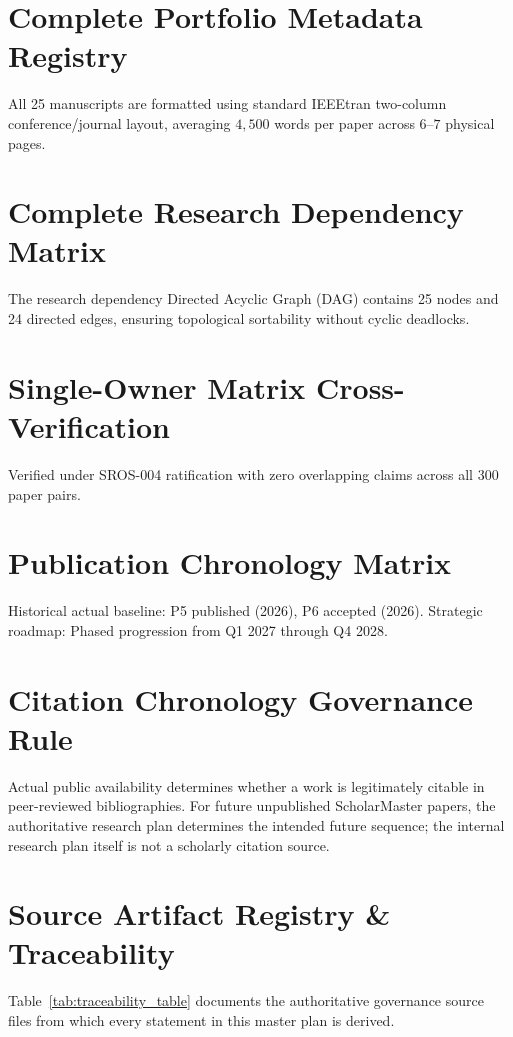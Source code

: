 \documentclass[11pt,letterpaper]{article}
\begin{document}
\appendix

\section{Complete Portfolio Metadata Registry}
\label{app:metadata}
All 25 manuscripts are formatted using standard IEEEtran two-column conference/journal layout, averaging $4,500$ words per paper across $6$--$7$ physical pages.

\section{Complete Research Dependency Matrix}
\label{app:dependencies}
The research dependency Directed Acyclic Graph (DAG) contains 25 nodes and 24 directed edges, ensuring topological sortability without cyclic deadlocks.

\section{Single-Owner Matrix Cross-Verification}
\label{app:single_owner}
Verified under SROS-004 ratification with zero overlapping claims across all 300 paper pairs.

\section{Publication Chronology Matrix}
\label{app:chronology}
Historical actual baseline: P5 published (2026), P6 accepted (2026). Strategic roadmap: Phased progression from Q1 2027 through Q4 2028.

\section{Citation Chronology Governance Rule}
\label{app:citation_rule}
Actual public availability determines whether a work is legitimately citable in peer-reviewed bibliographies. For future unpublished ScholarMaster papers, the authoritative research plan determines the intended future sequence; the internal research plan itself is not a scholarly citation source.

\section{Source Artifact Registry \& Traceability}
\label{app:source_traceability}
Table~\ref{tab:traceability_table} documents the authoritative governance source files from which every statement in this master plan is derived.
\end{document}
